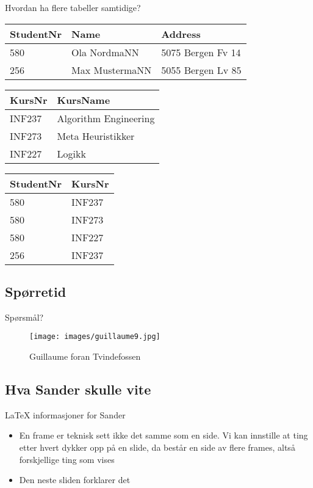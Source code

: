 \begin{frame}{Hvordan ha flere tabeller samtidige?}
\begin{tabular}{l|l|l}
 StudentNr & Name & Address\\\hline
 580 & Ola NordmaNN & 5075 Bergen Fv 14\\
 256 & Max MustermaNN & 5055 Bergen Lv 85\\
\end{tabular}
\vfill
\begin{tabular}{l|l}
KursNr & KursName \\\hline
INF237 & Algorithm Engineering\\
INF273 & Meta Heuristikker\\
INF227 & Logikk\\
\end{tabular}
\hfill
\begin{tabular}{l|l}
 StudentNr & KursNr\\\hline
 580 & INF237\\
 580 & INF273\\
 580 & INF227\\
 256 & INF237\\
\end{tabular}
\end{frame}

\subsection*{Spørretid}
\begin{frame}{Spørsmål?}
    \begin{figure}
        \centering
        \texttt{[image: images/guillaume9.jpg]}
        \caption{Guillaume foran Tvindefossen}
        \label{fig:guillaume9}
    \end{figure}
\end{frame}

\subsection*{Hva Sander skulle vite}
\begin{frame}{LaTeX informasjoner for Sander}
\begin{itemize}
    \item En frame er teknisk sett ikke det samme som en side. Vi kan innstille at ting etter hvert dykker opp på en slide, da består en side av flere frames, altså forskjellige ting som vises
    \item Den neste sliden forklarer det
\end{itemize}
\end{frame}

